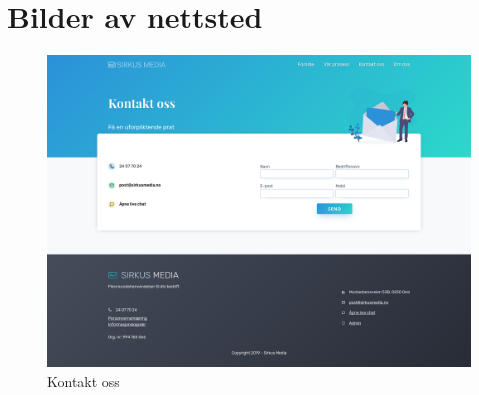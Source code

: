 \chapter{Bilder av nettsted}

\begin{figure}[H]
    \centering
    \includegraphics[width=0.8\paperwidth]{website-full/02-contact.png}
    \caption{Kontakt oss}
\end{figure}

